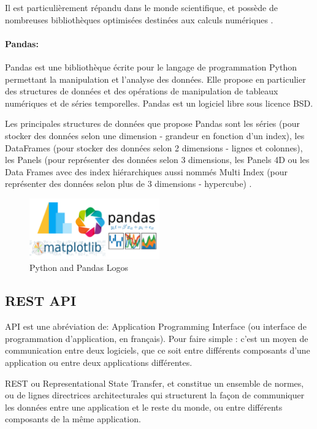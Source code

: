 Il est particulièrement répandu dans le monde scientifique, et possède de nombreuses bibliothèques optimisées destinées aux calculs numériques \cite{PythonLangageWikipedia}.
\renewcommand{\labelitemi}{$\bullet$}

\paragraph{Pandas:}
Pandas \cite{PandasPythonData} est une bibliothèque écrite pour le langage de programmation Python permettant la manipulation et l'analyse des données. Elle propose en particulier des structures de données et des opérations de manipulation de tableaux numériques et de séries temporelles. Pandas est un logiciel libre sous licence BSD.

Les principales structures de données que propose Pandas sont les séries (pour stocker des données selon une dimension - grandeur en fonction d'un index), les DataFrames (pour stocker des données selon 2 dimensions - lignes et colonnes), les Panels (pour représenter des données selon 3 dimensions, les Panels 4D ou les Data Frames avec des index hiérarchiques aussi nommés Multi Index (pour représenter des données selon plus de 3 dimensions - hypercube) \cite{Pandas2020}.


\begin{figure}[h!]
    \center
    \includegraphics[width=0.50\textwidth]{Images/chapter3/python_pandas.png}
    \caption{Python and Pandas Logos}
    \label{fig:Technologies}
\end{figure}

\subsection{REST API}
API est une abréviation de:  Application Programming Interface (ou interface de programmation d’application, en français). Pour faire simple : c’est un moyen de communication entre deux logiciels, que ce soit entre différents composants d’une application ou entre deux applications différentes.

REST ou Representational State Transfer, et constitue un ensemble de normes, ou de lignes directrices architecturales qui structurent la façon de communiquer les données entre une application et le reste du monde, ou entre différents composants de la même application.

